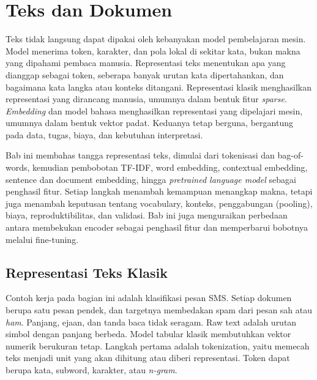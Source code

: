 \chapter{Teks dan Dokumen}\label{teks-dan-dokumen}

Teks tidak langsung dapat dipakai oleh kebanyakan model pembelajaran mesin. Model menerima token, karakter, dan pola lokal di sekitar kata, bukan makna yang dipahami pembaca manusia. Representasi teks menentukan apa yang dianggap sebagai token, seberapa banyak urutan kata dipertahankan, dan bagaimana kata langka atau konteks ditangani. Representasi klasik menghasilkan representasi yang dirancang manusia, umumnya dalam bentuk fitur \emph{sparse}. \emph{Embedding} dan model bahasa menghasilkan representasi yang dipelajari mesin, umumnya dalam bentuk vektor padat. Keduanya tetap berguna, bergantung pada data, tugas, biaya, dan kebutuhan interpretasi.

Bab ini membahas tangga representasi teks, dimulai dari tokenisasi dan bag-of-words, kemudian pembobotan TF-IDF, word embedding, contextual embedding, sentence dan document embedding, hingga \emph{pretrained language model} sebagai penghasil fitur. Setiap langkah menambah kemampuan menangkap makna, tetapi juga menambah keputusan tentang vocabulary, konteks, penggabungan (pooling), biaya, reproduktibilitas, dan validasi. Bab ini juga menguraikan perbedaan antara membekukan encoder sebagai penghasil fitur dan memperbarui bobotnya melalui fine-tuning.

\section{Representasi Teks Klasik}\label{representasi-teks-klasik}

Contoh kerja pada bagian ini adalah klasifikasi pesan SMS. Setiap dokumen berupa satu pesan pendek, dan targetnya membedakan spam dari pesan sah atau \emph{ham}. Panjang, ejaan, dan tanda baca tidak seragam. Raw text adalah urutan simbol dengan panjang berbeda. Model tabular klasik membutuhkan vektor numerik berukuran tetap. Langkah pertama adalah tokenization, yaitu memecah teks menjadi unit yang akan dihitung atau diberi representasi. Token dapat berupa kata, subword, karakter, atau \emph{n-gram}.


